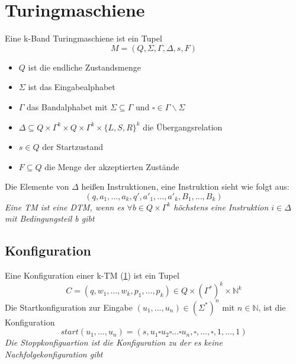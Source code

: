 \documentclass[DIV=15]{scrartcl}
\begin{document}
\section{Turingmaschiene}
    \label{sec:Turingmaschiene}
    Eine k-Band Turingmaschiene ist ein Tupel \[M=(Q,\Sigma,\Gamma,\Delta,s,F)\]
    \begin{itemize}
        \item \(Q\) ist die endliche Zustandsmenge
        \item \(\Sigma\) ist das Eingabealphabet
        \item \(\Gamma\) das Bandalphabet mit \(\Sigma\subseteq\Gamma\) und \(\square\in\Gamma\backslash\Sigma\)
        \item \(\Delta\subseteq Q\times\Gamma^k\times Q\times\Gamma^k\times {\{L,S,R\}}^k\) die Übergangsrelation
        \item \(s\in Q\) der Startzustand
        \item \(F\subseteq Q\) die Menge der akzeptierten Zustände
    \end{itemize}
    Die Elemente von \(\Delta\) heißen Instruktionen, eine Instruktion sieht wie folgt aus:
    \[(q,a_1,\dots,a_k,q',a'_1,\dots,a'_k,B_1,\dots,B_k)\]
    \textit{Eine TM ist eine DTM, wenn es \(\forall b\in Q\times\Gamma^k\) höchstens eine Instruktion \(i\in \Delta\) mit Bedingungsteil b gibt}
    \subsection{Konfiguration}
        Eine Konfiguration einer k-TM (\ref{sec:Turingmaschiene}) ist ein Tupel 
        \[C=(q,w_1,\dots,w_k,p_1,\dots,p_k)\in Q \times (\Gamma^*)^k \times \mathbb{N}^k\]
        Die Startkonfiguration zur Eingabe \((u_1,\dots,u_n)\in(\Sigma^*)^n\) mit \(n\in\mathbb{N}\), ist die Konfiguration
        \[start(u_1,\dots,u_n)=(s,u_1\square u_2\square\dots\square u_n,\square,\dots,\square,1,\dots,1)\]
        \textit{Die Stoppkonfiguartion ist die Konfiguration zu der es keine Nachfolgekonfiguration gibt}
\end{document}

